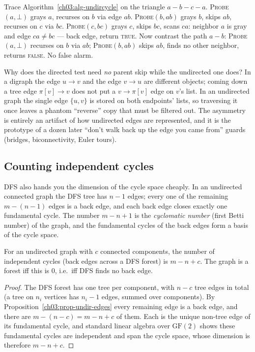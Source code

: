 \begin{labbox}
Trace Algorithm~\ref{ch03:alg-undircycle} on the triangle $a-b-c-a$. \textsc{Probe}$(a,\bot)$ grays $a$, recurses on $b$ via edge $ab$. \textsc{Probe}$(b,ab)$ grays $b$, skips $ab$, recurses on $c$ via $bc$. \textsc{Probe}$(c,bc)$ grays $c$, skips $bc$, scans $ca$: neighbor $a$ is gray and edge $ca\ne bc$ --- back edge, return \textsc{true}. Now contrast the path $a-b$: \textsc{Probe}$(a,\bot)$ recurses on $b$ via $ab$; \textsc{Probe}$(b,ab)$ skips $ab$, finds no other neighbor, returns \textsc{false}. No false alarm.
\end{labbox}

\begin{whybox}
Why does the directed test need \emph{no} parent skip while the undirected one does? In a digraph the edge $u\to v$ and the edge $v\to u$ are different objects; coming down a tree edge $\pi[v]\to v$ does not put a $v\to\pi[v]$ edge on $v$'s list. In an undirected graph the single edge $\{u,v\}$ is stored on both endpoints' lists, so traversing it once leaves a phantom ``reverse'' copy that must be filtered out. The asymmetry is entirely an artifact of how undirected edges are represented, and it is the prototype of a dozen later ``don't walk back up the edge you came from'' guards (bridges, biconnectivity, Euler tours).
\end{whybox}

\subsection{Counting independent cycles}

DFS also hands you the dimension of the cycle space cheaply. In an undirected connected graph the DFS tree has $n-1$ edges; every one of the remaining $m-(n-1)$ edges is a back edge, and each back edge closes exactly one fundamental cycle. The number $m-n+1$ is the \emph{cyclomatic number} (first Betti number) of the graph, and the fundamental cycles of the back edges form a basis of the cycle space.

\begin{corollary}\label{ch03:cor-betti}
For an undirected graph with $c$ connected components, the number of independent cycles (back edges across a DFS forest) is $m-n+c$. The graph is a forest iff this is $0$, i.e.\ iff DFS finds no back edge.
\end{corollary}

\begin{proof}
The DFS forest has one tree per component, with $n-c$ tree edges in total (a tree on $n_i$ vertices has $n_i-1$ edges, summed over components). By Proposition~\ref{ch03:prop-undir-edges} every remaining edge is a back edge, and there are $m-(n-c)=m-n+c$ of them. Each is the unique non-tree edge of its fundamental cycle, and standard linear algebra over $\mathrm{GF}(2)$ shows these fundamental cycles are independent and span the cycle space, whose dimension is therefore $m-n+c$.
\end{proof}


